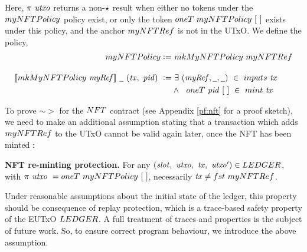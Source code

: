 Here, $\pi~\mathit{utxo}$ returns a non-$\star$ result when either
no tokens under the $\fun{myNFTPolicy}$ policy exist, or only the token
$\fun{oneT}~\fun{myNFTPolicy}~[~]$ exists under this policy, and the anchor $\fun{myNFTRef}$
is not in the UTxO. We define the policy,
\begin{align*}
  \fun{myNFTPolicy} \leteq &~ \fun{mkMyNFTPolicy}~ \fun{myNFTRef}
  \nextdef
  \applyMPScript{\fun{mkMyNFTPolicy}~ \var{myRef}}~\wcard~(\var{tx},~\var{pid})~\leteq &~
  \exists ~(\var{myRef}, \wcard, \wcard)~\in~ \inputs~\var{tx}~\\
  & \wedge ~~\fun{oneT}~\var{pid}~[~] ~\in~ \mint~\var{tx}
\end{align*}

%

To prove $\sim >$ for the $\NFT$ contract (see Appendix \ref{pf:nft} for a proof
sketch), we need to make an additional assumption stating that a transaction which
adds $\fun{myNFTRef}$ to the UTxO cannot be valid again later, once the NFT
has been minted :

\textbf{NFT re-minting protection.}
\label{sec:asm-nft}
For any $(\var{slot},~\var{utxo},~\var{tx},~\var{utxo'}) \in \LEDGER$, with
$\pi~\var{utxo}~= \fun{oneT}~\fun{myNFTPolicy}~[~]$, necessarily $\var{tx} \neq \fun{fst}~\mathsf{myNFTRef}$.

Under reasonable assumptions about the initial state of the ledger, this property
should be consequence of replay protection, which is a trace-based
safety property of the EUTxO $\LEDGER$. A full treatment of traces and properties is
the subject of future work. So, to ensure correct program behaviour, we introduce
the above assumption.


